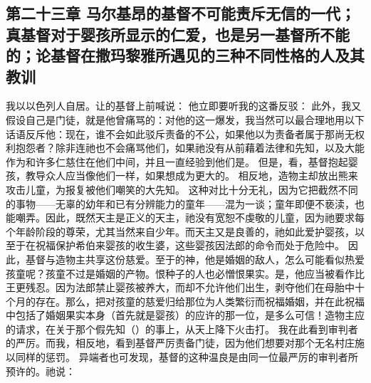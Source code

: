 \subsection{第二十三章 马尔基昂的基督不可能责斥无信的一代；真基督对于婴孩所显示的仁爱，也是另一基督所不能的；论基督在撒玛黎雅所遇见的三种不同性格的人及其教训}

我以以色列人自居。让的基督上前喊说： 他立即要听我的这番反驳： 此外，我又假设自己是门徒，就是他曾痛骂的：对他的这一爆发，我当然可以最合理地用以下话语反斥他：现在，谁不会如此驳斥责备的不公，如果他以为责备者属于那尚无权利抱怨者？除非连祂也不会痛骂他们，如果祂没有从前藉着法律和先知，以及大能作为和许多仁慈住在他们中间，并且一直经验到他们是。 但是，看，基督抱起婴孩，教导众人应当像他们一样，如果想成为更大的。 相反地，造物主却放出熊来攻击儿童，为报复被他们嘲笑的大先知。 这种对比十分无礼，因为它把截然不同的事物——无辜的幼年和已有分辨能力的童年——混为一谈；童年即便不亵渎，也能嘲弄。因此，既然天主是正义的天主，祂没有宽恕不虔敬的儿童，因为祂要求每个年龄阶段的尊荣，尤其当然来自少年。而天主又是良善的，祂如此爱护婴孩，以至于在祝福保护希伯来婴孩的收生婆，这些婴孩因法郎的命令而处于危险中。 因此，基督与造物主共享这份慈爱。至于的神，他是婚姻的敌人，怎么可能看似热爱孩童呢？孩童不过是婚姻的产物。恨种子的人也必憎恨果实。是，他应当被看作比王更残忍。因为法郎禁止婴孩被养大，而却不允许他们出生，剥夺他们在母胎中十个月的存在。那么，把对孩童的慈爱归给那位为人类繁衍而祝福婚姻，并在此祝福中包括了婚姻果实本身（首先就是婴孩）的应许的那一位，是多么可信！造物主应的请求，在关于那个假先知（）的事上，从天上降下火击打。 我在此看到审判者的严厉。而我，相反地，看到基督严厉责备门徒，因为他们想要对那个无名村庄施以同样的惩罚。 异端者也可发现，基督的这种温良是由同一位最严厉的审判者所预许的。祂说： 